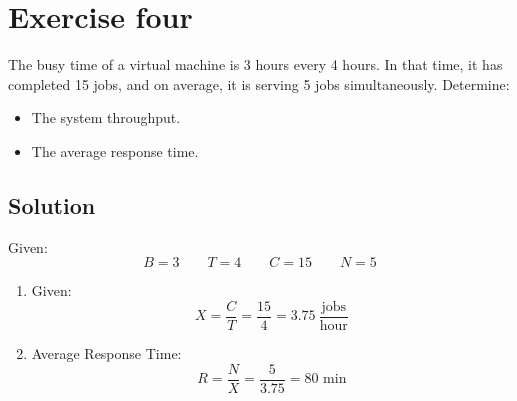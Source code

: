\section{Exercise four}

The busy time of a virtual machine is 3 hours every 4 hours. 
In that time, it has completed 15 jobs, and on average, it is serving 5 jobs simultaneously. 
Determine:
\begin{itemize}
    \item The system throughput.
    \item The average response time.
\end{itemize}

\subsection*{Solution}
Given: 
\[B=3\qquad T=4\qquad C=15 \qquad N=5\]
\begin{enumerate}
    \item Given:
        \[X=\dfrac{C}{T}=\dfrac{15}{4}=3.75\:\dfrac{\text{jobs}}{\text{hour}}\]
    \item Average Response Time:
        \[R=\dfrac{N}{X}=\dfrac{5}{3.75}=80\text{ min}\]
\end{enumerate}